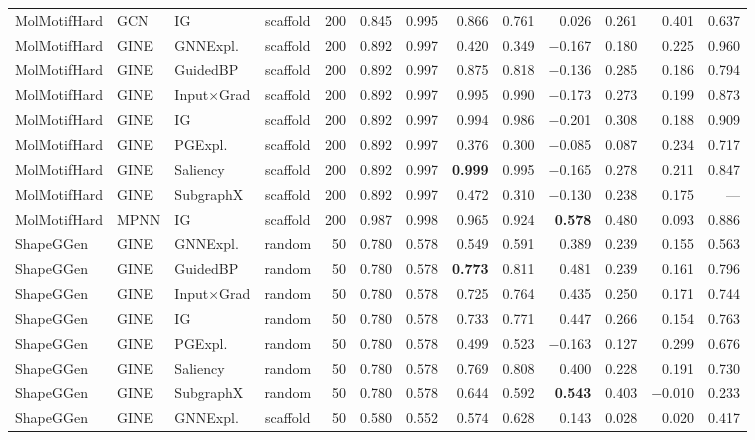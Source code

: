 \begin{table}[t]
{\begin{tabular}{lllcrrrrrrrrr}
MolMotifHard & GCN & IG & scaffold & 200 & 0.845 & 0.995 & 0.866 & 0.761 & 0.026 & 0.261 & 0.401 & 0.637 \\
MolMotifHard & GINE & GNNExpl. & scaffold & 200 & 0.892 & 0.997 & 0.420 & 0.349 & $-$0.167 & 0.180 & 0.225 & 0.960 \\
MolMotifHard & GINE & GuidedBP & scaffold & 200 & 0.892 & 0.997 & 0.875 & 0.818 & $-$0.136 & 0.285 & 0.186 & 0.794 \\
MolMotifHard & GINE & Input$\times$Grad & scaffold & 200 & 0.892 & 0.997 & 0.995 & 0.990 & $-$0.173 & 0.273 & 0.199 & 0.873 \\
MolMotifHard & GINE & IG & scaffold & 200 & 0.892 & 0.997 & 0.994 & 0.986 & $-$0.201 & 0.308 & 0.188 & 0.909 \\
MolMotifHard & GINE & PGExpl. & scaffold & 200 & 0.892 & 0.997 & 0.376 & 0.300 & $-$0.085 & 0.087 & 0.234 & 0.717 \\
MolMotifHard & GINE & Saliency & scaffold & 200 & 0.892 & 0.997 & \textbf{0.999} & 0.995 & $-$0.165 & 0.278 & 0.211 & 0.847 \\
MolMotifHard & GINE & SubgraphX & scaffold & 200 & 0.892 & 0.997 & 0.472 & 0.310 & $-$0.130 & 0.238 & 0.175 & --- \\
MolMotifHard & MPNN & IG & scaffold & 200 & 0.987 & 0.998 & 0.965 & 0.924 & \textbf{0.578} & 0.480 & 0.093 & 0.886 \\
\addlinespace[2pt]
ShapeGGen & GINE & GNNExpl. & random & 50 & 0.780 & 0.578 & 0.549 & 0.591 & 0.389 & 0.239 & 0.155 & 0.563 \\
ShapeGGen & GINE & GuidedBP & random & 50 & 0.780 & 0.578 & \textbf{0.773} & 0.811 & 0.481 & 0.239 & 0.161 & 0.796 \\
ShapeGGen & GINE & Input$\times$Grad & random & 50 & 0.780 & 0.578 & 0.725 & 0.764 & 0.435 & 0.250 & 0.171 & 0.744 \\
ShapeGGen & GINE & IG & random & 50 & 0.780 & 0.578 & 0.733 & 0.771 & 0.447 & 0.266 & 0.154 & 0.763 \\
ShapeGGen & GINE & PGExpl. & random & 50 & 0.780 & 0.578 & 0.499 & 0.523 & $-$0.163 & 0.127 & 0.299 & 0.676 \\
ShapeGGen & GINE & Saliency & random & 50 & 0.780 & 0.578 & 0.769 & 0.808 & 0.400 & 0.228 & 0.191 & 0.730 \\
ShapeGGen & GINE & SubgraphX & random & 50 & 0.780 & 0.578 & 0.644 & 0.592 & \textbf{0.543} & 0.403 & $-$0.010 & 0.233 \\
\addlinespace[2pt]
ShapeGGen & GINE & GNNExpl. & scaffold & 50 & 0.580 & 0.552 & 0.574 & 0.628 & 0.143 & 0.028 & 0.020 & 0.417 \\

\end{tabular}}
\end{table}
